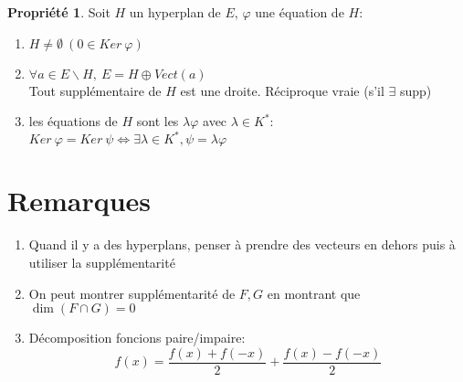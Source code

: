 \documentclass[fleqn]{article}
\theoremstyle{definition} \newtheorem*{defi}{D\'efinition}
\theoremstyle{definition} \newtheorem*{theo}{Th\'eor\`eme}
\theoremstyle{definition} \newtheorem*{coro}{Corollaire}
\theoremstyle{definition} \newtheorem*{nota}{Notation}
\theoremstyle{remark} \newtheorem*{rqs}{Remarques}
\theoremstyle{definition} \newtheorem*{prop}{Propri\'et\'e}
\begin{document}
\begin{prop} Soit $H$ un hyperplan de $E$, $\varphi$ une \'equation de $H$:
	\begin{enumerate}
		\item $H \neq \emptyset\ (0 \in Ker\ \varphi)$
		\item $\forall a \in E \backslash H,\ E = H \oplus Vect(a)$ \\
			Tout suppl\'ementaire de $H$ est une droite. R\'eciproque vraie (s'il $\exists$ supp)
		\item les \'equations de $H$ sont les $\lambda \varphi$ avec $\lambda \in K^*$: \\
			$Ker\ \varphi = Ker\ \psi \Leftrightarrow \exists \lambda \in K^*, \psi = \lambda \varphi$
	\end{enumerate}
\end{prop}

\section{Remarques}
\begin{enumerate}
	\item Quand il y a des hyperplans, penser \`a prendre des vecteurs en dehors puis \`a utiliser la suppl\'ementarit\'e
	\item On peut montrer suppl\'ementarit\'e de $F,G$ en montrant que $\dim (F\cap G) = 0$
	\item D\'ecomposition foncions paire/impaire: \[f(x) = \frac{f(x) + f(-x)}{2} + \frac{f(x) - f(-x)}{2}\]
\end{enumerate}
\end{document}
